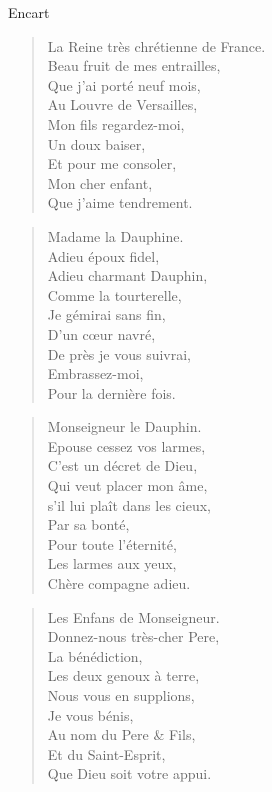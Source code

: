 \begin{diary}{Encart}{}
        \begin{verse}La Reine très chrétienne de
                                 France.\\Beau fruit de mes entrailles,\\Que j'ai porté neuf mois,\\Au Louvre de
                                    Versailles,\\Mon fils
                                 regardez-moi,\\Un doux baiser,\\Et pour me consoler,\\Mon cher enfant,\\Que j'aime tendrement.\\\end{verse}
        \bigskip

        \begin{verse}Madame la Dauphine.\\Adieu époux fidel,\\Adieu charmant Dauphin,\\Comme la tourterelle,\\Je gémirai sans fin,\\D'un cœur navré,\\De près je vous suivrai,\\Embrassez-moi,\\Pour la dernière fois.\\\end{verse}
        \bigskip

        \begin{verse}Monseigneur le Dauphin.\\Epouse cessez vos larmes,\\C’est un décret de Dieu,\\Qui veut placer mon âme,\\s'il lui plaît dans les cieux,\\Par sa bonté,\\Pour toute l'éternité,\\Les larmes aux yeux,\\Chère compagne adieu.\\\end{verse}
        \bigskip

        \begin{verse}Les Enfans de Monseigneur.\\Donnez-nous très-cher
                                    Pere,\\La bénédiction,\\Les deux genoux à terre,\\Nous vous en supplions,\\Je vous bénis,\\Au nom du Pere \& Fils,\\Et du Saint-Esprit,\\Que Dieu soit votre appui.\\\end{verse}
        \bigskip


\end{diary}
